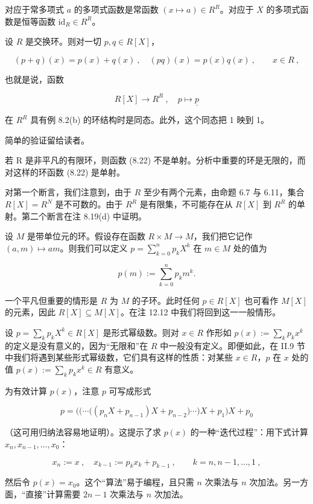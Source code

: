\begin{remark}

\begin{items}
\item

对应于常多项式 $a$ 的多项式函数是常函数 $(x \mapsto a) \in R^R$。对应于 $X$ 的多项式函数是恒等函数 $\mathrm{id}_R \in R^R$。

\item

设 $R$ 是交换环。则对一切 $p, q \in R[X]$，

\[
(p+q)(x)=p(x)+q(x)~,\quad(p q)(x)=p(x)q(x)~,\qquad x\in R~,
\]

也就是说，函数

\[
R[X]\to R^{R}~,\quad p\mapsto\underline{p}
\]

在  $ R^R $ 具有例 8.2(b) 的环结构时是同态。此外，这个同态把 1 映到 1。

\proofhead
简单的验证留给读者。
\item

若 R 是非平凡的有限环，则函数 (8.22) 不是单射。分析中重要的环是无限的，而对这样的环函数 (8.22) 是单射。

\proofhead
对第一个断言，我们注意到，由于 $R$ 至少有两个元素，由命题 6.7 与 6.11，集合 $R[X] = R^N$ 是不可数的。由于 $R^R$ 是有限集，不可能存在从 $R[X]$ 到 $R^R$ 的单射。第二个断言在注 8.19(d) 中证明。
\item

设 $M$ 是带单位元的环。假设存在函数 $R \times M \to M$，我们把它记作 $(a, m) \mapsto am$。则我们可以定义 $p = \sum_{k=0}^{n} p_k X^k$ 在 $m \in M$ 处的值为

\[
p(m):=\sum_{k=0}^{n} p_{k} m^{k}.
\]

一个平凡但重要的情形是 $R$ 为 $M$ 的子环。此时任何 $p \in R[X]$ 也可看作 $M[X]$ 的元素，因此 $R[X] \subseteq M[X]$。在注 12.12 中我们将回到这一一般情形。

\item

设  $ p = \sum_kp_k X^k \in R[X] $ 是形式幂级数。则对 $ x \in R $ 作形如  $ p(x) := \sum_kp_kx^k $ 的定义是没有意义的，因为“无限和”在  $ R $ 中一般没有定义。即便如此，在 II.9 节中我们将遇到某些形式幂级数，它们具有这样的性质：对某些  $ x \in R $，$ p $ 在 $ x $ 处的值  $ p(x) := \sum_kp_kx^k \in R $ 有意义。

\item

为有效计算 $p(x)$，注意 $p$ 可写成形式

\[
p=\Big(\big(\cdots\big((p_{n}X+p_{n-1})X+p_{n-2}\big)\cdots\big)X+p_{1}\Big)X+p_{0}
\]

（这可用归纳法容易地证明）。这提示了求 $p(x)$ 的一种“迭代过程”：用下式计算 $x_n, x_{n-1}, \ldots, x_0$：

\[
x_{n}:=x~,\quad x_{k-1}:=p_{k}x_{k}+p_{k-1}~,\qquad k=n,n-1,\ldots,1~,
\]

然后令 $p(x)=x_0$。这个“算法”易于编程，且只需 $n$ 次乘法与 $n$ 次加法。另一方面，“直接”计算需要 $2n-1$ 次乘法与 $n$ 次加法。

\end{items}

\end{remark}


